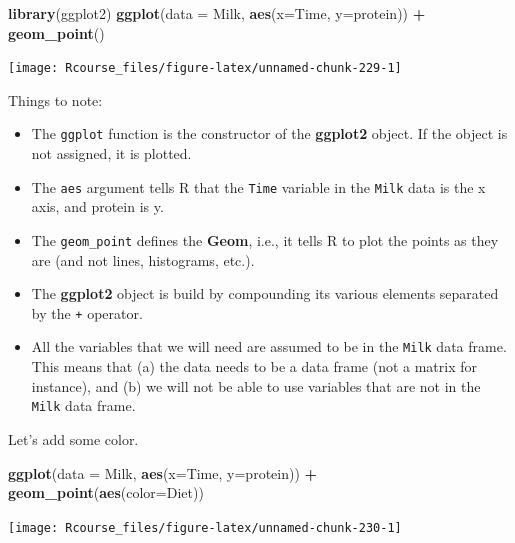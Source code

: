 \documentclass[]{book}
\newenvironment{Shaded}{\begin{snugshade}}{\end{snugshade}}
\newcommand{\KeywordTok}[1]{\textcolor[rgb]{0.13,0.29,0.53}{\textbf{#1}}}
\newcommand{\DataTypeTok}[1]{\textcolor[rgb]{0.13,0.29,0.53}{#1}}
\newcommand{\StringTok}[1]{\textcolor[rgb]{0.31,0.60,0.02}{#1}}
\newcommand{\OperatorTok}[1]{\textcolor[rgb]{0.81,0.36,0.00}{\textbf{#1}}}
\newcommand{\NormalTok}[1]{#1}
\providecommand{\tightlist}{%
  \setlength{\itemsep}{0pt}\setlength{\parskip}{0pt}}
\theoremstyle{definition}
\theoremstyle{definition}
\theoremstyle{definition}
\theoremstyle{remark}
\begin{document}
\begin{Shaded}
\begin{Highlighting}[]
\KeywordTok{library}\NormalTok{(ggplot2)}
\KeywordTok{ggplot}\NormalTok{(}\DataTypeTok{data =}\NormalTok{ Milk, }\KeywordTok{aes}\NormalTok{(}\DataTypeTok{x=}\NormalTok{Time, }\DataTypeTok{y=}\NormalTok{protein)) }\OperatorTok{+}
\StringTok{  }\KeywordTok{geom_point}\NormalTok{()}
\end{Highlighting}
\end{Shaded}

\texttt{[image: Rcourse\_files/figure-latex/unnamed-chunk-229-1]}

Things to note:

\begin{itemize}
\tightlist
\item
  The \texttt{ggplot} function is the constructor of the
  \textbf{ggplot2} object. If the object is not assigned, it is plotted.
\item
  The \texttt{aes} argument tells R that the \texttt{Time} variable in
  the \texttt{Milk} data is the x axis, and protein is y.
\item
  The \texttt{geom\_point} defines the \textbf{Geom}, i.e., it tells R
  to plot the points as they are (and not lines, histograms, etc.).
\item
  The \textbf{ggplot2} object is build by compounding its various
  elements separated by the \texttt{+} operator.
\item
  All the variables that we will need are assumed to be in the
  \texttt{Milk} data frame. This means that (a) the data needs to be a
  data frame (not a matrix for instance), and (b) we will not be able to
  use variables that are not in the \texttt{Milk} data frame.
\end{itemize}

Let's add some color.

\begin{Shaded}
\begin{Highlighting}[]
\KeywordTok{ggplot}\NormalTok{(}\DataTypeTok{data =}\NormalTok{ Milk, }\KeywordTok{aes}\NormalTok{(}\DataTypeTok{x=}\NormalTok{Time, }\DataTypeTok{y=}\NormalTok{protein)) }\OperatorTok{+}
\StringTok{  }\KeywordTok{geom_point}\NormalTok{(}\KeywordTok{aes}\NormalTok{(}\DataTypeTok{color=}\NormalTok{Diet))}
\end{Highlighting}
\end{Shaded}

\texttt{[image: Rcourse\_files/figure-latex/unnamed-chunk-230-1]}
\end{document}
